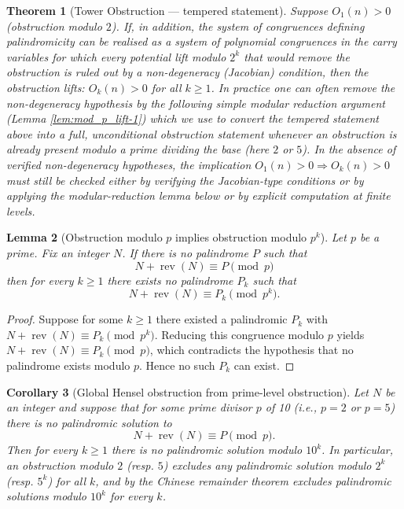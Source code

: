 \documentclass[12pt,a4paper]{article}
\newtheorem{theorem}{Theorem}[section]
\newtheorem{lemma}[theorem]{Lemma}
\newtheorem{corollary}[theorem]{Corollary}
\begin{document}
\begin{theorem}[Tower Obstruction --- tempered statement]%
Suppose $O_1(n) > 0$ (obstruction modulo $2$). If, in addition, the system of congruences defining palindromicity can be realised as a system of polynomial congruences in the carry variables for which every potential lift modulo $2^k$ that would remove the obstruction is ruled out by a non-degeneracy (Jacobian) condition, then the obstruction lifts: $O_k(n) > 0$ for all $k\ge 1$.
In practice one can often remove the non-degeneracy hypothesis by the following simple modular reduction argument (Lemma \ref{lem:mod_p_lift-1}) which we use to convert the tempered statement above into a full, unconditional obstruction statement whenever an obstruction is already present modulo a prime dividing the base (here $2$ or $5$).
In the absence of verified non-degeneracy hypotheses, the implication $O_1(n)>0 \Rightarrow O_k(n)>0$ must still be checked either by verifying the Jacobian-type conditions or by applying the modular-reduction lemma below or by explicit computation at finite levels.
\end{theorem}

\begin{lemma}[Obstruction modulo $p$ implies obstruction modulo $p^k$]
Let $p$ be a prime. Fix an integer $N$. If there is no palindrome $P$ such that
$$N+\operatorname{rev}(N)\equiv P\pmod p$$
then for every $k\ge1$ there exists no palindrome $P_k$ such that
$$N+\operatorname{rev}(N)\equiv P_k\pmod{p^k}.$$
\end{lemma}

\begin{proof}
Suppose for some $k\ge1$ there existed a palindromic $P_k$ with
$N+\operatorname{rev}(N)\equiv P_k\pmod{p^k}$. Reducing this congruence modulo $p$ yields
$N+\operatorname{rev}(N)\equiv P_k\pmod p$, which contradicts the hypothesis that no palindrome exists modulo $p$. Hence no such $P_k$ can exist.
\end{proof}

\begin{corollary}[Global Hensel obstruction from prime-level obstruction]%
Let $N$ be an integer and suppose that for some prime divisor $p$ of 10 (i.e., $p=2$ or $p=5$) there is no palindromic solution to
$$N+\operatorname{rev}(N)\equiv P\pmod p.$$ Then for every $k\ge1$ there is no palindromic solution modulo $10^k$. In particular, an obstruction modulo $2$ (resp. $5$) excludes any palindromic solution modulo $2^k$ (resp. $5^k$) for all $k$, and by the Chinese remainder theorem excludes palindromic solutions modulo $10^k$ for every $k$.
\end{corollary}
\end{document}
